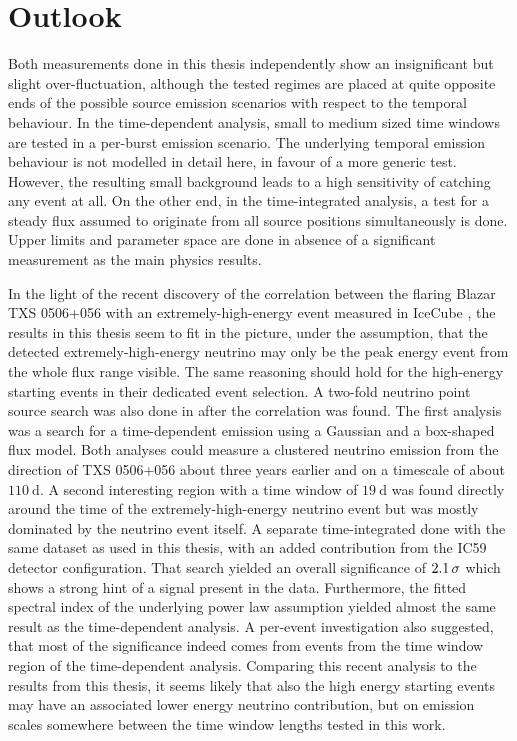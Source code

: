 \chapter{Outlook}

Both measurements done in this thesis independently show an insignificant but slight over-fluctuation, although the tested regimes are placed at quite opposite ends of the possible source emission scenarios with respect to the temporal behaviour.
In the time-dependent analysis, small to medium sized time windows are tested in a per-burst emission scenario.
The underlying temporal emission behaviour is not modelled in detail here, in favour of a more generic test.
However, the resulting small background leads to a high sensitivity of catching any event at all.
On the other end, in the time-integrated analysis, a test for a steady flux assumed to originate from all source positions simultaneously is done.
Upper limits and parameter space are done in absence of a significant measurement as the main physics results.

In the light of the recent discovery of the correlation between the flaring Blazar TXS 0506+056 with an extremely-high-energy event measured in IceCube \cite{IceCube:2018dnn}, the results in this thesis seem to fit in the picture, under the assumption, that the detected extremely-high-energy neutrino may only be the peak energy event from the whole flux range visible.
The same reasoning should hold for the high-energy starting events in their dedicated event selection.
A two-fold neutrino point source search was also done in \cite{IceCube:2018cha} after the correlation was found.
The first analysis was a search for a time-dependent emission using a Gaussian and a box-shaped flux model.
Both analyses could measure a clustered neutrino emission from the direction of TXS 0506+056 about three years earlier and on a timescale of about $\SI{110}{\day}$.
A second interesting region with a time window of $\SI{19}{\day}$ was found directly around the time of the extremely-high-energy neutrino event but was mostly dominated by the neutrino event itself.
A separate time-integrated done with the same dataset as used in this thesis, with an added contribution from the IC59 detector configuration.
That search yielded an overall significance of $\num{2.1}\,\sigma$ which shows a strong hint of a signal present in the data.
Furthermore, the fitted spectral index of the underlying power law assumption yielded almost the same result as the time-dependent analysis.
A per-event investigation also suggested, that most of the significance indeed comes from events from the time window region of the time-dependent analysis.
Comparing this recent analysis to the results from this thesis, it seems likely that also the high energy starting events may have an associated lower energy neutrino contribution, but on emission scales somewhere between the time window lengths tested in this work.

